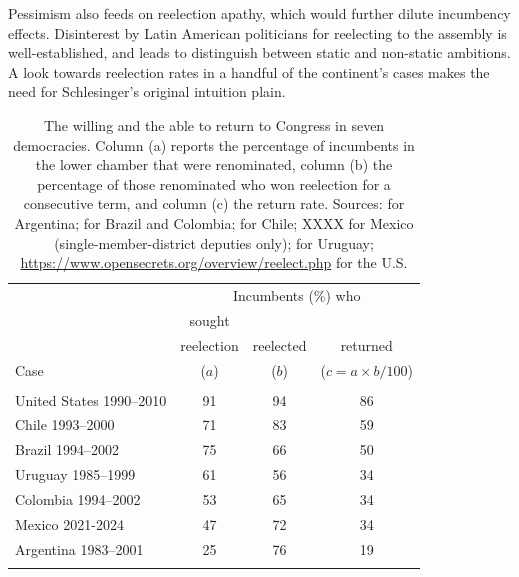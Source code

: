 \documentclass[letter,12pt]{article}
\newcommand{\mc}{\multicolumn}
\begin{document}
Pessimism also feeds on reelection apathy, which would further dilute incumbency effects. Disinterest by Latin American politicians for reelecting to the assembly is well-established, and leads \citet{morgenstern.2002b} to distinguish between static and non-static ambitions. A look towards reelection rates in a handful of the continent's cases makes the need for Schlesinger's \citeyearpar{schlesinger.1966} original intuition plain.

\begin{table}
  \centering
  \begin{tabular}{lccc}
                             & \mc{3}{c}{Incumbents (\%) who} \\ 
                             & sought      &             &            \\ [-.5ex]
                             & reelection  & reelected   & returned   \\ [-.5ex]
    Case                     &   ($a$)     &   ($b$)     & ($c=a\times b/100$) \\ \hline \\ [-1.25ex] 
    United States 1990--2010 &    91       &     94      &     86     \\ 
    Chile 1993--2000         &    71       &     83      &     59     \\
    Brazil 1994--2002        &    75       &     66      &     50     \\
    Uruguay 1985--1999       &    61       &     56      &     34     \\
    Colombia 1994--2002      &    53       &     65      &     34     \\                 
    Mexico 2021-2024         &    47       &     72      &     34     \\
    Argentina 1983--2001     &    25       &     76      &     19     \\ \\ [-1.25ex] \hline
  \end{tabular}
  \caption{The willing and the able to return to Congress in seven democracies. Column (a) reports the percentage of incumbents in the lower chamber that were renominated, column (b) the percentage of those renominated who won reelection for a consecutive term, and column (c) the return rate. Sources: \citet[][:658]{jones.etal.amateurLegis.2002} for Argentina; \citet{botero.renno-Career-reelec-br-col2007} for Brazil and Colombia; \citet{naviaIncumbency.2000} for Chile; XXXX for Mexico (single-member-district deputies only); \citet{altman-chasquetti-Career-reelec-urug2005} for Uruguay; \protect\url{https://www.opensecrets.org/overview/reelect.php} for the U.S.}\label{T:retRate}
\end{table}
\end{document}
